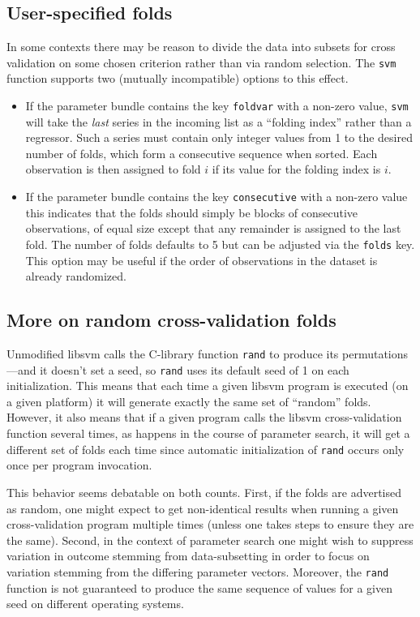 \documentclass{article}
\begin{document}
\subsection{User-specified folds}
\label{sec:user-folds}

In some contexts there may be reason to divide the data into subsets
for cross validation on some chosen criterion rather than via random
selection. The \texttt{svm} function supports two (mutually
incompatible) options to this effect.
\begin{itemize}
\item If the parameter bundle contains the key \texttt{foldvar} with a
  non-zero value, \texttt{svm} will take the \textit{last} series in
  the incoming list as a ``folding index'' rather than a
  regressor. Such a series must contain only integer values from 1 to
  the desired number of folds, which form a consecutive sequence when
  sorted. Each observation is then assigned to fold $i$ if its value
  for the folding index is $i$.
\item If the parameter bundle contains the key \texttt{consecutive}
  with a non-zero value this indicates that the folds should simply be
  blocks of consecutive observations, of equal size except that any
  remainder is assigned to the last fold. The number of folds defaults
  to 5 but can be adjusted via the \texttt{folds} key. This option may
  be useful if the order of observations in the dataset is already
  randomized.
\end{itemize}

\subsection{More on random cross-validation folds}
\label{sec:random-folds}

Unmodified \textsf{libsvm} calls the C-library function \texttt{rand}
to produce its permutations---and it doesn't set a seed, so
\texttt{rand} uses its default seed of 1 on each initialization. This
means that each time a given \textsf{libsvm} program is executed (on a
given platform) it will generate exactly the same set of ``random''
folds. However, it also means that if a given program calls the
\textsf{libsvm} cross-validation function several times, as happens in
the course of parameter search, it will get a different set of folds
each time since automatic initialization of \texttt{rand} occurs only
once per program invocation.

This behavior seems debatable on both counts. First, if the folds are
advertised as random, one might expect to get non-identical results
when running a given cross-validation program multiple times (unless
one takes steps to ensure they are the same). Second, in the context
of parameter search one might wish to suppress variation in outcome
stemming from data-subsetting in order to focus on variation stemming
from the differing parameter vectors. Moreover, the \texttt{rand}
function is not guaranteed to produce the same sequence of values for
a given seed on different operating systems.
\end{document}
